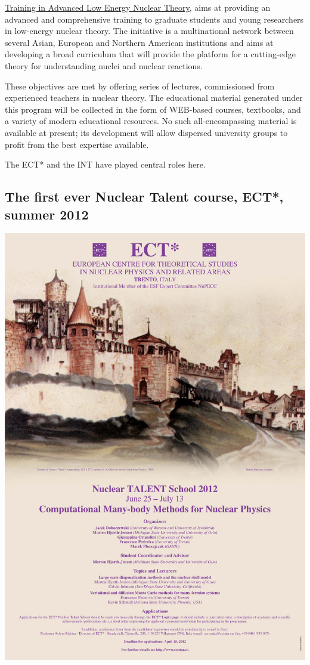 \documentclass[%
oneside,                 %
final,                   %
10pt]{article}
\begin{document}
\href{{https://fribtheoryalliance.org/TALENT/}}{Training in Advanced Low Energy Nuclear Theory},  
aims at providing an advanced and comprehensive training to graduate students
and young researchers in low-energy nuclear theory. The initiative
is a multinational network between several Asian, European and Northern
American institutions and aims at developing a broad curriculum that
will provide the platform for a cutting-edge theory for understanding
nuclei and nuclear reactions.

These objectives are met by
offering series of lectures, commissioned from experienced teachers
in nuclear theory. The educational material generated under this
program will be collected in the form of WEB-based courses,
textbooks, and a variety of modern educational resources. No such
all-encompassing material is available at present; its development
will allow dispersed university groups to profit from the best
expertise available.

The ECT* and the INT have played central roles here.

\subsection{The first ever Nuclear Talent course, ECT*, summer 2012}

\vspace{6mm}

\centerline{\includegraphics[width=0.6\linewidth]{Photos/talent2012.pdf}}
\end{document}
